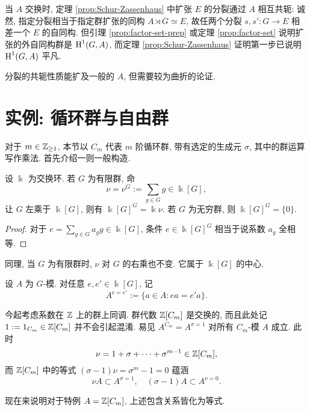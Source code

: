 当 $A$ 交换时, 定理 \ref{prop:Schur-Zassenhaus} 中扩张 $E$ 的分裂通过 $A$ 相互共轭: 诚然, 指定分裂相当于指定群扩张的同构 $A \rtimes G \simeq E$, 故任两个分裂 $s, s': G \to E$ 相差一个 $E$ 的自同构. 但引理 \ref{prop:factor-set-prep} 或定理 \ref{prop:factor-set} 说明扩张的外自同构群是 $\operatorname{H}^1(G, A)$, 而定理 \ref{prop:Schur-Zassenhaus} 证明第一步已说明 $\operatorname{H}^1(G, A)$ 平凡.

分裂的共轭性质能扩及一般的 $A$, 但需要较为曲折的论证.

\section{实例: 循环群与自由群}\label{sec:coh-cyclic-free}
对于 $m \in \mathbb{Z}_{\geq 1}$, 本节以 $C_m$ 代表 $m$ 阶循环群, 带有选定的生成元 $\sigma$, 其中的群运算写作乘法. 首先介绍一则一般构造.

\begin{definition-proposition}\label{def:group-norm}
	设 $\Bbbk$ 为交换环. 若 $G$ 为有限群, 命
	\[ \nu = \nu^G := \sum_{g \in G} g \in \Bbbk[G], \]
	让 $G$ 左乘于 $\Bbbk[G]$, 则有 $\Bbbk[G]^G = \Bbbk \nu$. 若 $G$ 为无穷群, 则 $\Bbbk[G]^G = \{0\}$.
\end{definition-proposition}
\begin{proof}
	对于 $e = \sum_{g \in G} a_g g \in \Bbbk[G]$, 条件 $e \in \Bbbk[G]^G$ 相当于说系数 $a_g$ 全相等.
\end{proof}

同理, 当 $G$ 为有限群时, $\nu$ 对 $G$ 的右乘也不变. 它属于 $\Bbbk[G]$ 的中心.

\begin{convention}\label{con:G-mod-equalizer}
	设 $A$ 为 $G$-模. 对任意 $e, e' \in \Bbbk[G]$, 记
	\[ A^{e=e'} := \{ a \in A: ea = e'a \}. \]
\end{convention}

今起考虑系数在 $\mathbb{Z}$ 上的群上同调. 群代数 $\mathbb{Z}[C_m]$ 是交换的, 而且此处记 $1 := 1_{C_m} \in \mathbb{Z}[C_m]$ 并不会引起混淆. 易见 $A^{C_m} = A^{\sigma=1}$ 对所有 $C_m$-模 $A$ 成立. 此时
\begin{equation*}
	\nu = 1 + \sigma + \cdots + \sigma^{m-1} \in \mathbb{Z}[C_m],
\end{equation*}
而 $\mathbb{Z}[C_m]$ 中的等式 $(\sigma - 1)\nu = \sigma^m - 1 = 0$ 蕴涵
\[ \nu A \subset A^{\sigma=1}, \quad (\sigma - 1)A \subset A^{\nu=0}. \]

现在来说明对于特例 $A = \mathbb{Z}[C_m]$, 上述包含关系皆化为等式.

